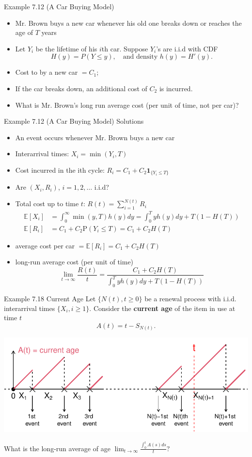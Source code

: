 \documentclass[letterpaper,handout, mathserif]{beamer}
\def\p{\mathrm P}
\def\E{\mathbb E}
\begin{document}
\begin{frame}{Example 7.12 (A Car Buying Model)}
\begin{itemize}
\item Mr. Brown buys a new car whenever his old one breaks down or reaches the age of $T$ years
\item Let $Y_i$ be the lifetime of his $i$th car. Suppose $Y_i$'s are i.i.d with CDF
$$H(y) = P(Y \le y),\quad\text{and density }h(y) = H'(y).$$
\item Cost to by a new car $= C_1$;
\item If the car breaks down, an additional cost of $C_2$ is incurred.
\item What is Mr. Brown's long run average cost (per unit of time, not per car)?
\end{itemize}
\end{frame}
\begin{frame}{Example 7.12 (A Car Buying Model) Solutions}
\begin{itemize}
\item An event occurs whenever Mr. Brown buys a new car
\item Interarrival times: $X_i= \min(Y_i,T)$
\item Cost incurred in the ith cycle: $R_i= C_1+ C_2\mathbf{1}_{\{Y_i\le T\}}$
\item Are $(X_i,R_i)$, $i = 1,2,\ldots$ i.i.d?
\item Total cost up to time $t$: $R(t) = \sum_{i=1}^{N(t)}R_i$
\begin{align*}
\E[X_i] &=\int^{\infty}_0\min(y,T)h(y)dy = \int^T_0 yh(y)dy +T(1-H(T))\\
\E[R_i] &= C_1+ C_2\p(Y_i\le T) = C_1+ C_2H(T)
\end{align*}
\item average cost per car $= \E[R_i]= C_1+ C_2H(T)$
\item long-run average cost (per unit of time)
$$
\lim_{t\to\infty}\frac{R(t)}{t}=\frac{C_1+ C_2H(T)}{\int^T_0 yh(y)dy +T(1-H(T))}
$$
\end{itemize}
\end{frame}
\begin{frame}{Example 7.18 Current Age}
Let $\{N(t),t\ge 0\}$ be a renewal process with i.i.d. interarrival times
$\{X_i, i\ge 1\}$. Consider the {\bf current age} of the item in use at
time $t$
$$
A(t) = t - S_{N(t)}.
$$
\begin{center}
\includegraphics[width=\textwidth]{L17_CurrentAge.pdf}
\end{center}
What is the long-run average of age
$\displaystyle\lim_{t\to\infty}\frac{\int_0^tA(s)ds}{t}?$
\end{frame}
\end{document}
